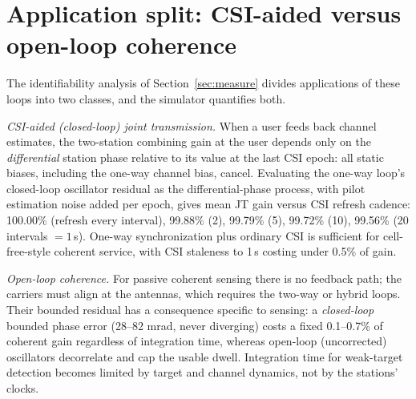 \documentclass[10pt]{article}
\begin{document}
\section{Application split: CSI-aided versus open-loop coherence}
\label{sec:csi}
The identifiability analysis of Section~\ref{sec:measure} divides
applications of these loops into two classes, and the simulator
quantifies both.

\emph{CSI-aided (closed-loop) joint transmission.} When a user feeds
back channel estimates, the two-station combining gain at the user
depends only on the \emph{differential} station phase relative to its
value at the last CSI epoch: all static biases, including the one-way
channel bias, cancel. Evaluating the one-way loop's closed-loop
oscillator residual as the differential-phase process, with pilot
estimation noise added per epoch, gives mean JT gain versus CSI refresh
cadence: 100.00\% (refresh every interval), 99.88\% (2), 99.79\% (5),
99.72\% (10), 99.56\% (20 intervals $=1$\,s). One-way synchronization
plus ordinary CSI is sufficient for cell-free-style coherent service,
with CSI staleness to 1\,s costing under 0.5\% of gain.

\emph{Open-loop coherence.} For passive coherent sensing there is no
feedback path; the carriers must align at the antennas, which requires
the two-way or hybrid loops. Their bounded residual has a consequence
specific to sensing: a \emph{closed-loop} bounded phase error (28--82
mrad, never diverging) costs a fixed 0.1--0.7\% of coherent gain
regardless of integration time, whereas open-loop (uncorrected)
oscillators decorrelate and cap the usable dwell. Integration time for
weak-target detection becomes limited by target and channel dynamics,
not by the stations' clocks.
\end{document}
